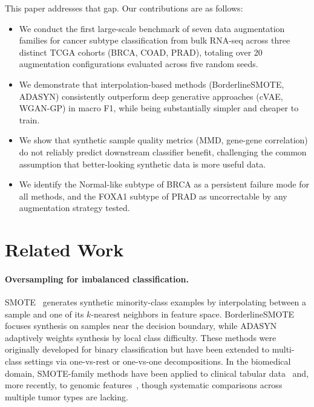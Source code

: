 \documentclass{article}
\begin{document}
This paper addresses that gap. Our contributions are as follows:
\begin{itemize}
  \item We conduct the first large-scale benchmark of seven data augmentation families for cancer
    subtype classification from bulk RNA-seq across three distinct TCGA cohorts (BRCA, COAD,
    PRAD), totaling over 20 augmentation configurations evaluated across five random seeds.
  \item We demonstrate that interpolation-based methods (BorderlineSMOTE, ADASYN) consistently
    outperform deep generative approaches (cVAE, WGAN-GP) in macro F1, while being
    substantially simpler and cheaper to train.
  \item We show that synthetic sample quality metrics (MMD, gene-gene correlation) do not
    reliably predict downstream classifier benefit, challenging the common assumption that
    better-looking synthetic data is more useful data.
  \item We identify the Normal-like subtype of BRCA as a persistent failure mode for all methods,
    and the FOXA1 subtype of PRAD as uncorrectable by any augmentation strategy tested.
\end{itemize}

\section{Related Work}

\paragraph{Oversampling for imbalanced classification.}
SMOTE~\cite{Chawla2002} generates synthetic minority-class examples by interpolating between a
sample and one of its $k$-nearest neighbors in feature space. BorderlineSMOTE~\cite{Han2005}
focuses synthesis on samples near the decision boundary, while ADASYN~\cite{He2008} adaptively
weights synthesis by local class difficulty. These methods were originally developed for binary
classification but have been extended to multi-class settings via one-vs-rest or one-vs-one
decompositions. In the biomedical domain, SMOTE-family methods have been applied to clinical
tabular data~\cite{Blagus2013} and, more recently, to genomic features~\cite{Lemasson2022},
though systematic comparisons across multiple tumor types are lacking.
\end{document}
